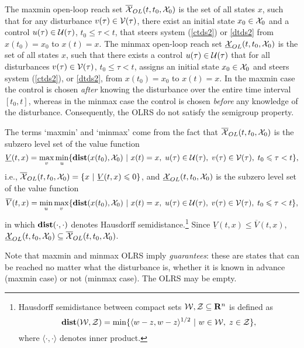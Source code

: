 The maxmin open-loop reach set $\OXOL(t, t_0, \XX_0)$ is the set of all states $x$,
such that for any disturbance $v(\tau)\in\VV(\tau)$, there exist an initial state
$x_0\in\XX_0$ and a control $u(\tau)\in\UU(\tau)$, $t_0\leq\tau<t$, that
steers system (\ref{ctds2}) or \ref{dtds2} from $x(t_0)=x_0$ to $x(t)=x$.
\label{def_maxminolrs}
\ed
{}
The minmax open-loop reach set $\UXOL(t, t_0, \XX_0)$ is the set of all states $x$,
such that there exists a control $u(\tau)\in\UU(\tau)$ that for all disturbances
$v(\tau)\in\VV(\tau)$, $t_0\leq\tau<t$, assigns an initial state $x_0\in\XX_0$
and steers system (\ref{ctds2}), or \ref{dtds2}, from $x(t_0)=x_0$ to $x(t)=x$.
\label{def_minmaxolrs}
\ed
In the maxmin case the control is chosen \emph{after} knowing the disturbance
over the entire time interval $[t_0, t]$, whereas in the minmax case
the control is chosen \emph{before} any knowledge
of the disturbance.   Consequently, the OLRS do not satisfy the semigroup property.

The terms `maxmin' and `minmax' come from the fact that
$\OXOL(t, t_0, \XX_0)$ is the subzero level set of the value function
\begin{equation}
\underline{V}(t, x) =
\max_v\min_u\{{\bf dist}(x(t_0), \XX_0) ~|~ x(t)=x, \; u(\tau)\in\UU(\tau), \;
v(\tau)\in\VV(\tau), \; t_0\leq\tau<t\},
\label{maxminvf}
\end{equation}
i.e., $\OXOL(t, t_0, \XX_0) = \{ x~|~\underline{V}(t, x) \le 0\}$,
and $\UXOL(t, t_0, \XX_0)$ is the subzero level set of the value function
\begin{equation}
\overline{V}(t, x) =
\min_u\max_v\{{\bf dist}(x(t_0), \XX_0) ~|~ x(t)=x, \; u(\tau)\in\UU(\tau), \;
v(\tau)\in\VV(\tau), \; t_0\leq\tau<t\},
\label{minmaxvf}
\end{equation}
in which ${\bf dist}(\cdot, \cdot)$ denotes Hausdorff
semidistance.\footnote{Hausdorff semidistance between compact sets
$\WW, \ZZ \subseteq {\bf R}^n$ is defined as
\[ {\bf dist}(\WW, \ZZ) = \min\{\langle w-z, w-z\rangle^{1/2}
~|~ w\in\WW, \; z\in\ZZ\}, \]
where $\langle\cdot, \cdot\rangle$ denotes inner product.}
Since $\underline{V}(t, x)\leq\overline{V}(t, x)$, 
$\UXOL(t, t_0, \XX_0)\subseteq\OXOL(t, t_0, \XX_0)$.

Note that maxmin and minmax OLRS imply \emph{guarantees}: these are states that can be reached
no matter what the disturbance is, whether it is known in advance 
(maxmin case) or not (minmax case).
The OLRS may be empty.


